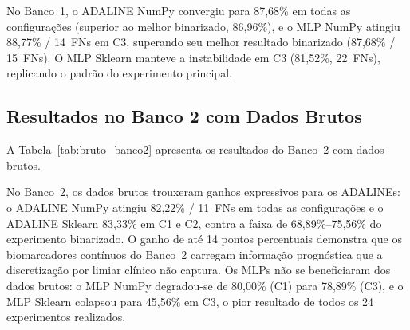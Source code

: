 No Banco~1, o ADALINE NumPy convergiu para 87,68\% em todas as configurações (superior ao melhor binarizado, 86,96\%), e o MLP NumPy atingiu 88,77\% / 14~FNs em C3, superando seu melhor resultado binarizado (87,68\% / 15~FNs). O MLP Sklearn manteve a instabilidade em C3 (81,52\%, 22~FNs), replicando o padrão do experimento principal.

\subsection{Resultados no Banco 2 com Dados Brutos}
\label{sec:bruto_banco2}

A Tabela~\ref{tab:bruto_banco2} apresenta os resultados do Banco~2 com dados brutos.

\begin{table}[H]
\centering
\caption{Acurácia (\%) e Falsos Negativos (FN), Banco 2, dados brutos. Conjunto de teste: 90 pacientes (29 óbitos / 61 sobreviventes).}
\label{tab:bruto_banco2}
\end{table}

No Banco~2, os dados brutos trouxeram ganhos expressivos para os ADALINEs: o ADALINE NumPy atingiu 82,22\% / 11~FNs em todas as configurações e o ADALINE Sklearn 83,33\% em C1 e C2, contra a faixa de 68,89\%--75,56\% do experimento binarizado. O ganho de até 14 pontos percentuais demonstra que os biomarcadores contínuos do Banco~2 carregam informação prognóstica que a discretização por limiar clínico não captura. Os MLPs não se beneficiaram dos dados brutos: o MLP NumPy degradou-se de 80,00\% (C1) para 78,89\% (C3), e o MLP Sklearn colapsou para 45,56\% em C3, o pior resultado de todos os 24 experimentos realizados.

